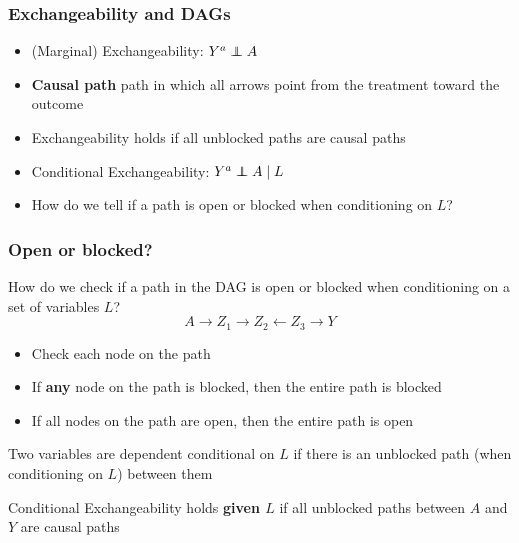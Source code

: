 \documentclass{beamer}
\def\independenT#1#2{\mathrel{\rlap{$#1#2$}\mkern2mu{#1#2}}}
\newcommand\indep{\protect\mathpalette{\protect\independenT}{\perp}}
\begin{document}
\begin{frame}
\frametitle{Exchangeability and DAGs}

\begin{itemize}
    \item (Marginal) Exchangeability: $Y^a \indep A$ \pause 
    \item \textbf{Causal path} path in which all arrows point from the treatment toward the outcome \pause
    \item Exchangeability holds if all unblocked paths are causal paths \pause  
     \item Conditional Exchangeability: $Y^a \indep A \mid L$ \pause 
     \item How do we tell if a path is open or blocked when conditioning on $L$?
\end{itemize}

\end{frame}




\begin{frame}
\frametitle{Open or blocked?}
How do we check if a path in the DAG is open or blocked when conditioning on a set of variables $L$?
    \[A \rightarrow Z_1 \rightarrow Z_2 \leftarrow Z_3 \rightarrow Y\]
\pause 
\begin{itemize}
    \item Check each node on the path
    \item If \textbf{any} node on the path is blocked, then the entire path is blocked
    \item If all nodes on the path are open, then the entire path is open
\end{itemize}

\pause

\vspace{2em}
Two variables are dependent conditional on $L$ if there is an unblocked path (when conditioning on $L$) between them  

\pause

\vspace{2em}
Conditional Exchangeability holds \textbf{given $L$} if all unblocked paths between $A$ and $Y$ are causal paths


\end{frame}
\end{document}

